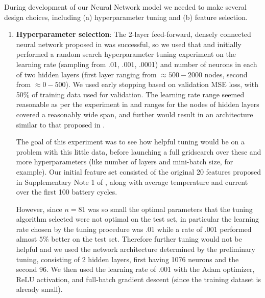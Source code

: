 \documentclass{article}
\begin{document}
During development of our Neural Network model we needed to make several design choices, including (a) hyperparameter tuning and (b) feature selection.

\begin{enumerate}[label=(\alph*), leftmargin=.35in]
\item \textbf{Hyperparameter selection}: The 2-layer feed-forward, densely connected neural network proposed in \cite{roman2021machine} was successful, so we used that and initially performed a random search hyperparameter tuning experiment on the learning rate (sampling from .01, .001, .0001) and number of neurons in each of two hidden layers (first layer ranging from $\approx 500 - 2000$ nodes, second from $\approx 0 - 500$).  We used early stopping based on validation MSE loss, with 50$\%$ of training data used for validation.  The learning rate range seemed reasonable as per the experiment in \cite{kerastuner} and ranges for the nodes of hidden layers covered a reasonably wide span, and further would result in an architecture similar to that proposed in \cite{roman2021machine}. 

The goal of this experiment was to see how helpful tuning would be on a problem with this little data, before launching a full gridsearch over these and more hyperparameters (like number of layers and mini-batch size, for example).   Our initial feature set consisted of the original 20 features proposed in Supplementary Note 1 of \cite{severson2019data}, along with average temperature and current over the first 100 battery cycles.

However, since $n = 81$ was so small the optimal parameters that the tuning algorithm selected were not optimal on the test set, in particular the learning rate chosen by the tuning procedure was .01 while a rate of .001 performed almost $5 \%$ better on the test set. Therefore further tuning would not be helpful and we used the network architecture determined by the preliminary tuning, consisting of 2 hidden layers, first having 1076 neurons and the second 96.  We then used the learning rate of .001 with the Adam optimizer, ReLU activation, and full-batch gradient descent (since the training dataset is already small).  



\end{enumerate}
\end{document}
